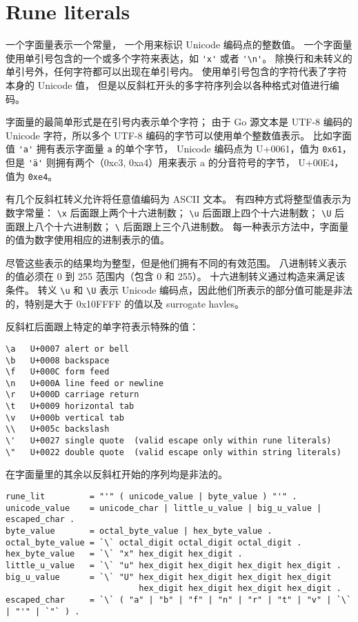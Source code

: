 

\section{Rune literals}
一个\rune{}字面量表示一个\rune{}常量，
一个用来标识 Unicode 编码点的整数值。
一个\rune{}字面量使用单引号包含的一个或多个字符来表达，如 \lstinline|'x'| 或者 \lstinline|'\n'|。
除换行和未转义的单引号外，任何字符都可以出现在单引号内。
使用单引号包含的字符代表了字符本身的 Unicode 值，
但是以反斜杠开头的多字符序列会以各种格式对值进行编码。

\rune{}字面量的最简单形式是在引号内表示单个字符；
由于 Go 源文本是 UTF-8 编码的 Unicode 字符，所以多个 UTF-8 编码的字节可以使用单个整数值表示。
比如字面值 \lstinline|'a'| 拥有表示字面量 \lstinline|a| 的单个字节，
Unicode 编码点为 U+0061，值为 \lstinline|0x61|，但是 \lstinline|'ä'| 则拥有两个（0xc3, 0xa4）用来表示 a 的分音符号的字节，
U+00E4，值为 \lstinline|0xe4|。

有几个反斜杠转义允许将任意值编码为 ASCII 文本。
有四种方式将整型值表示为数字常量：
\lstinline|\x| 后面跟上两个十六进制数；
\lstinline|\u| 后面跟上四个十六进制数；
\lstinline|\U| 后面跟上八个十六进制数；
\lstinline|\|  后面跟上三个八进制数。
每一种表示方法中，字面量的值为数字使用相应的进制表示的值。

尽管这些表示的结果均为整型，但是他们拥有不同的有效范围。
八进制转义表示的值必须在 0 到 255 范围内（包含 0 和 255）。
十六进制转义通过构造来满足该条件。%
转义 \lstinline|\u| 和 \lstinline|\U| 表示 Unicode 编码点，因此他们所表示的部分值可能是非法的，特别是大于 0x10FFFF 的值以及 surrogate havles。

反斜杠后面跟上特定的单字符表示特殊的值：
\begin{lstlisting}
\a   U+0007 alert or bell
\b   U+0008 backspace
\f   U+000C form feed
\n   U+000A line feed or newline
\r   U+000D carriage return
\t   U+0009 horizontal tab
\v   U+000b vertical tab
\\   U+005c backslash
\'   U+0027 single quote  (valid escape only within rune literals)
\"   U+0022 double quote  (valid escape only within string literals)
\end{lstlisting}

在\rune{}字面量里的其余以反斜杠开始的序列均是非法的。
\begin{lstlisting}[style=EBNF]
rune_lit         = "'" ( unicode_value | byte_value ) "'" .
unicode_value    = unicode_char | little_u_value | big_u_value | escaped_char .
byte_value       = octal_byte_value | hex_byte_value .
octal_byte_value = `\` octal_digit octal_digit octal_digit .
hex_byte_value   = `\` "x" hex_digit hex_digit .
little_u_value   = `\` "u" hex_digit hex_digit hex_digit hex_digit .
big_u_value      = `\` "U" hex_digit hex_digit hex_digit hex_digit
                           hex_digit hex_digit hex_digit hex_digit .
escaped_char     = `\` ( "a" | "b" | "f" | "n" | "r" | "t" | "v" | `\` | "'" | `"` ) .
\end{lstlisting}


